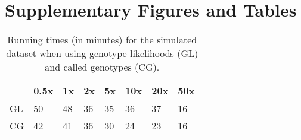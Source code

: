 \documentclass[a4paper]{article}
\begin{document}
\newpage
\section{Supplementary Figures and Tables}

\begin{table}[h]
\centering
\begin{tabular}{l|lllllll}
 & 0.5x & 1x & 2x & 5x & 10x & 20x & 50x \\
 \hline
GL & 50 & 48 & 36 & 35 & 36 & 37 & 16 \\
CG & 42 & 41 & 36 & 30 & 24 & 23 & 16
\end{tabular}
\caption{Running times (in minutes) for the simulated dataset when using genotype likelihoods (GL) and called genotypes (CG).}
\label{STab:run_times}
\end{table}
\end{document}
